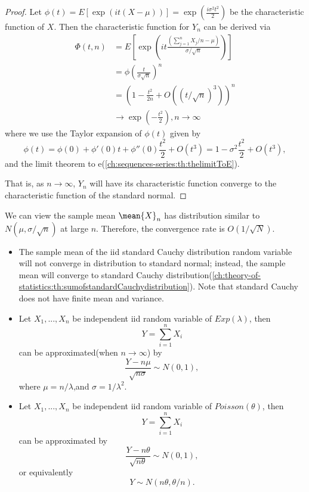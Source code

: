 \begin{refsection}
\begin{proof}
Let $\phi(t) = E[\exp(it(X - \mu))] = \exp(\frac{i\sigma^2t^2}{2})$ be the characteristic function of $X$. 
Then the characteristic function for $Y_n$ can be derived via
\begin{align*}
\Phi(t,n) &= E[\exp(it \frac{(\sum_{j=1}^n X_j/n - \mu)}{\sigma/\sqrt{n}})] \\
&= \phi(\frac{t}{\sigma\sqrt{n}})^n \\
&= (1 - \frac{t^2}{2n} + O((t/\sqrt{n})^3))^n \\
& \to \exp(-\frac{t^2}{2}), n\to \infty
\end{align*}
where we use the Taylor expansion of $\phi(t)$ given by
$$\phi(t) = \phi(0) + \phi'(0)t + \phi''(0)\frac{t^2}{2} + O(t^3) = 1 - \sigma^2\frac{t^2}{2} + O(t^3),$$
and the limit theorem to e(\autoref{ch:sequences-series:th:thelimitToE}).

That is, as $n\to \infty$, $Y_n$ will have its characteristic function converge to the characteristic function of the standard normal.
\end{proof}



\begin{remark}
We can view the sample mean 
$\mean{X}_n$
has distribution similar to $N(\mu,\sigma/\sqrt{n})$
at large $n$. Therefore, the convergence rate is $O(1/\sqrt{N})$.
\end{remark}



\begin{remark}\hfill
\begin{itemize}
	\item The sample mean of the iid standard Cauchy distribution random variable will not converge in distribution to standard normal; instead, the sample mean will converge to standard Cauchy distribution(\autoref{ch:theory-of-statistics:th:sumofstandardCauchydistribution}). Note that standard Cauchy does not have finite mean and variance.
\end{itemize}
\end{remark}


\begin{example}\hfill
\begin{itemize}
	\item Let $X_1,...,X_n$ be independent iid random variable of $Exp(\lambda)$, then
	$$Y = \sum_{i=1}^n X_i$$
	can be approximated(when $n\to \infty$) by $$\frac{Y - n\mu}{\sqrt{n\sigma}}\sim N(0,1),$$
	where $\mu = n/\lambda$,and $\sigma = 1/\lambda^2$.
	\item Let $X_1,...,X_n$ be independent iid random variable of $Poisson(\theta)$, then
	$$Y = \sum_{i=1}^n X_i$$
	can be approximated by $$\frac{Y - n\theta}{\sqrt{n\theta}}\sim N(0,1),$$
	or equivalently
	$$Y \sim N(n\theta,\theta/n).$$
\end{itemize}
\end{example}


\end{refsection}
